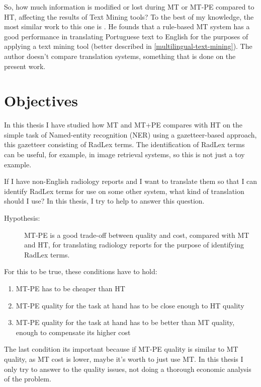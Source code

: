 So, how much information is modified or lost during MT or MT-PE compared to HT, affecting the results of Text Mining tools? To the best of my knowledge, the most similar work to this one is \citep{Castilla2007a}. He founds that a rule-based MT system has a good performance in translating Portuguese text to English for the purposes of applying a text mining tool (better described in \ref{multilingual-text-mining}). The author doesn't compare translation systems, something that is done on the present work.

\section{Objectives}

In this thesis I have studied how MT and MT+PE compares with HT on the simple task of Named-entity recognition (NER) using a gazetteer-based approach, this gazetteer consisting of RadLex terms. The identification of RadLex terms can be useful, for example, in image retrieval \citep{Gerstmair2012} systems, so this is not just a toy example. 

If I have non-English radiology reports and I want to translate them so that I can identify RadLex terms for use on some other system, what kind of translation should I use? In this thesis, I try to help to answer this question. 

\newcommand{\hypothesis}{
\begin{description}
	\item[Hypothesis:] MT-PE is a good trade-off between quality and cost, compared with MT and HT, for translating radiology reports for the purpose of identifying RadLex terms. 
\end{description}
}
\hypothesis

For this to be true, these conditions have to hold:

\begin{enumerate}
	\item MT-PE has to be cheaper than HT
	\item MT-PE quality for the task at hand has to be close enough to HT quality
	\item MT-PE quality for the task at hand has to be better than MT quality, enough to compensate its higher cost
\end{enumerate}

The last condition its important because if MT-PE quality is similar to MT quality, as MT cost is lower, maybe it's worth to just use MT. In this thesis I only try to answer to the quality issues, not doing a thorough economic analysis of the problem. 

